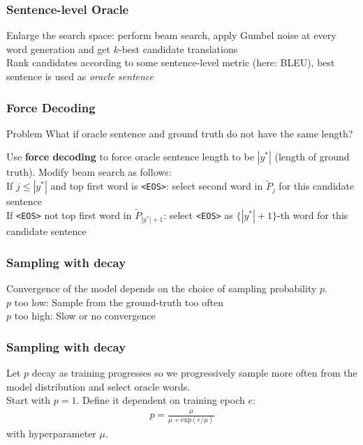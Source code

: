 \documentclass{beamer}
\begin{document}

\begin{frame}
    \frametitle{Sentence-level Oracle}
    Enlarge the search space: perform beam search, apply Gumbel noise at every word generation and get $k$-best candidate translations\\
    \bigskip
    Rank candidates according to some sentence-level metric (here: BLEU), best sentence is used as \emph{oracle sentence}
\end{frame}


\begin{frame}
    \frametitle{Force Decoding}
    \begin{alertblock}{Problem}
        What if oracle sentence and ground truth do not have the same length?
    \end{alertblock}
    \bigskip
    Use \textbf{force decoding} to force oracle sentence length to be $|y^*|$ (length of ground truth). Modify beam search as follows:\\
    \bigskip
    If $j \leq |y^*|$ and top first word is \texttt{<EOS>}: select second word in $\tilde{P}_j$ for this candidate sentence\\
    \bigskip
    If \texttt{<EOS>} not top first word in $\tilde{P}_{|y^*|+1}$: select \texttt{<EOS>} as $\{|y^*|+1 \}$-th word for this candidate sentence
\end{frame}


\begin{frame}
    \frametitle{Sampling with decay}
    Convergence of the model depends on the choice of sampling probability $p$.\\
    \bigskip
    $p$ too low: Sample from the ground-truth too often\\
    \smallskip
    $p$ too high: Slow or no convergence
\end{frame}


\begin{frame}
    \frametitle{Sampling with decay}
    Let $p$ decay as training progresses so we progressively sample more often from the model distribution and select oracle words.\\
    \bigskip
    Start with $p=1$. Define it dependent on training epoch $e$:\\
    \begin{gather}
        p = \frac{\mu}{\mu + \mathrm{exp}(e/\mu)}
    \end{gather}
    with hyperparameter $\mu$.
\end{frame}
\end{document}
